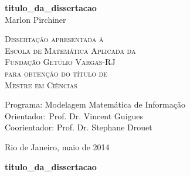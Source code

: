 \documentclass[12pt,twoside,a4paper]{book}
\numberwithin{equation}{section}
\begin{document}
\frontmatter 
\fancyhead[RO]{{\footnotesize\rightmark}\hspace{2em}\thepage}
\setcounter{tocdepth}{2}
\fancyhead[LE]{\thepage\hspace{2em}\footnotesize{\leftmark}}
\fancyhead[RE,LO]{}
\fancyhead[RO]{{\footnotesize\rightmark}\hspace{2em}\thepage}

\onehalfspacing  %

\thispagestyle{empty}
\begin{center}
    \vspace*{2.3cm}
    \textbf{\Large{\glsdesc*{titulo_da_dissertacao}}}\\
    
    \vspace*{1.2cm}
    \Large{Marlon Pirchiner}
    
    \vskip 2cm
    \textsc{
    Dissertação apresentada à\\[-0.25cm] 
    Escola de Matemática Aplicada da\\[-0.25cm]
    Fundação Getúlio Vargas-RJ\\[-0.25cm]
    para obtenção do título de \\[-0.25cm]
    Mestre em Ciências}
    
    \vskip 1.5cm
    Programa: Modelagem Matemática de Informação\\
    Orientador: Prof. Dr. Vincent Guigues\\
    Coorientador: Prof. Dr. Stephane Drouet

   	\vskip 1cm
    \normalsize{}
    
    \vskip 0.5cm
    \normalsize{Rio de Janeiro, maio de 2014}
\end{center}

%
%
%
\newpage
\thispagestyle{empty}
    \begin{center}
        \vspace*{2.3 cm}
	    \textbf{\Large{\glsdesc*{titulo_da_dissertacao}}}\\
        \vspace*{2 cm}
    \end{center}
\end{document}
